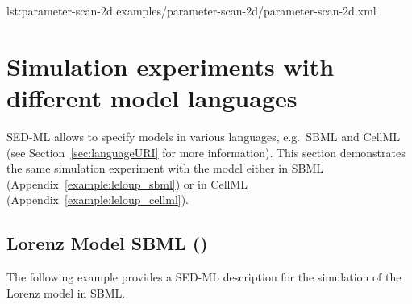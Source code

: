 {lst:parameter-scan-2d}
{examples/parameter-scan-2d/parameter-scan-2d.xml}

\section{Simulation experiments with different model languages}
SED-ML allows to specify models in various languages, e.g.\ SBML and CellML (see Section~\ref{sec:languageURI} for more information). This section demonstrates the same simulation experiment with the model either in SBML (Appendix~\ref{example:leloup_sbml}) or in CellML (Appendix~\ref{example:leloup_cellml}).

\subsection{Lorenz Model SBML ()}
\label{example:lorenz_sbml}
The following example provides a SED-ML description for the simulation of the Lorenz model in SBML.

